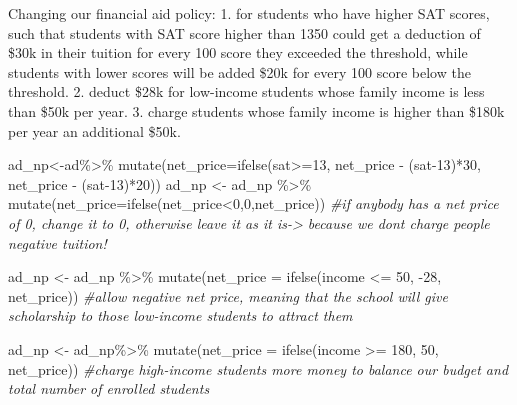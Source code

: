 \documentclass[
]{article}
\newenvironment{Shaded}{\begin{snugshade}}{\end{snugshade}}
\newcommand{\AttributeTok}[1]{\textcolor[rgb]{0.77,0.63,0.00}{#1}}
\newcommand{\CommentTok}[1]{\textcolor[rgb]{0.56,0.35,0.01}{\textit{#1}}}
\newcommand{\DecValTok}[1]{\textcolor[rgb]{0.00,0.00,0.81}{#1}}
\newcommand{\FunctionTok}[1]{\textcolor[rgb]{0.00,0.00,0.00}{#1}}
\newcommand{\NormalTok}[1]{#1}
\newcommand{\OtherTok}[1]{\textcolor[rgb]{0.56,0.35,0.01}{#1}}
\newcommand{\SpecialCharTok}[1]{\textcolor[rgb]{0.00,0.00,0.00}{#1}}
\begin{document}
Changing our financial aid policy: 1. for students who have higher SAT
scores, such that students with SAT score higher than 1350 could get a
deduction of \$30k in their tuition for every 100 score they exceeded
the threshold, while students with lower scores will be added \$20k for
every 100 score below the threshold. 2. deduct \$28k for low-income
students whose family income is less than \$50k per year. 3. charge
students whose family income is higher than \$180k per year an
additional \$50k.

\begin{Shaded}
\begin{Highlighting}[]
\NormalTok{ad\_np}\OtherTok{\textless{}{-}}\NormalTok{ad}\SpecialCharTok{\%\textgreater{}\%}
  \FunctionTok{mutate}\NormalTok{(}\AttributeTok{net\_price=}\FunctionTok{ifelse}\NormalTok{(sat}\SpecialCharTok{\textgreater{}=}\DecValTok{13}\NormalTok{, }
\NormalTok{                              net\_price }\SpecialCharTok{{-}}\NormalTok{ (sat}\DecValTok{{-}13}\NormalTok{)}\SpecialCharTok{*}\DecValTok{30}\NormalTok{,}
\NormalTok{                              net\_price }\SpecialCharTok{{-}}\NormalTok{ (sat}\DecValTok{{-}13}\NormalTok{)}\SpecialCharTok{*}\DecValTok{20}\NormalTok{))}
\NormalTok{ad\_np }\OtherTok{\textless{}{-}}\NormalTok{ ad\_np }\SpecialCharTok{\%\textgreater{}\%}
  \FunctionTok{mutate}\NormalTok{(}\AttributeTok{net\_price=}\FunctionTok{ifelse}\NormalTok{(net\_price}\SpecialCharTok{\textless{}}\DecValTok{0}\NormalTok{,}\DecValTok{0}\NormalTok{,net\_price)) }\CommentTok{\#if anybody has a net price of 0, change it to 0, otherwise leave it as it is{-}\textgreater{} because we don\textquotesingle{}t charge people negative tuition!}

\NormalTok{ad\_np }\OtherTok{\textless{}{-}}\NormalTok{ ad\_np }\SpecialCharTok{\%\textgreater{}\%}
  \FunctionTok{mutate}\NormalTok{(}\AttributeTok{net\_price =} \FunctionTok{ifelse}\NormalTok{(income }\SpecialCharTok{\textless{}=} \DecValTok{50}\NormalTok{, }\SpecialCharTok{{-}}\DecValTok{28}\NormalTok{, net\_price)) }\CommentTok{\#allow negative net price, meaning that the school will give scholarship to those low{-}income students to attract them}

\NormalTok{ad\_np }\OtherTok{\textless{}{-}}\NormalTok{ ad\_np}\SpecialCharTok{\%\textgreater{}\%}
  \FunctionTok{mutate}\NormalTok{(}\AttributeTok{net\_price =} \FunctionTok{ifelse}\NormalTok{(income }\SpecialCharTok{\textgreater{}=} \DecValTok{180}\NormalTok{, }\DecValTok{50}\NormalTok{, net\_price)) }\CommentTok{\#charge high{-}income students more money to balance our budget and total number of enrolled students}
\end{Highlighting}
\end{Shaded}
\end{document}
